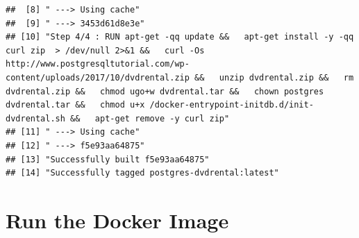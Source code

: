 \documentclass[]{book}
\theoremstyle{definition}
\theoremstyle{definition}
\theoremstyle{definition}
\theoremstyle{remark}
\begin{document}
\begin{verbatim}
##  [8] " ---> Using cache"                                                                                                                                                                                                                                                                                                                                                                             
##  [9] " ---> 3453d61d8e3e"                                                                                                                                                                                                                                                                                                                                                                            
## [10] "Step 4/4 : RUN apt-get -qq update &&   apt-get install -y -qq curl zip  > /dev/null 2>&1 &&   curl -Os http://www.postgresqltutorial.com/wp-content/uploads/2017/10/dvdrental.zip &&   unzip dvdrental.zip &&   rm dvdrental.zip &&   chmod ugo+w dvdrental.tar &&   chown postgres dvdrental.tar &&   chmod u+x /docker-entrypoint-initdb.d/init-dvdrental.sh &&   apt-get remove -y curl zip"
## [11] " ---> Using cache"                                                                                                                                                                                                                                                                                                                                                                             
## [12] " ---> f5e93aa64875"                                                                                                                                                                                                                                                                                                                                                                            
## [13] "Successfully built f5e93aa64875"                                                                                                                                                                                                                                                                                                                                                               
## [14] "Successfully tagged postgres-dvdrental:latest"
\end{verbatim}

\hypertarget{run-the-docker-image}{%
\section{Run the Docker Image}\label{run-the-docker-image}}
\end{document}
